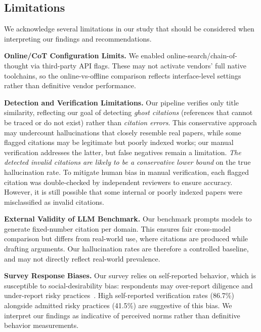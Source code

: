 \subsection{Limitations}

We acknowledge several limitations in our study that should be considered when interpreting our findings and recommendations.


\noindent
\textbf{Online/CoT Configuration Limits.}
We enabled online-search/chain-of-thought via third-party API flags. These may not activate vendors' full native toolchains, so the online-vs-offline comparison reflects interface-level settings rather than definitive vendor performance.

\noindent
\textbf{Detection and Verification Limitations.}
Our pipeline verifies only title similarity, reflecting our goal of detecting \emph{ghost citations} (references that cannot be traced or do not exist) rather than \emph{citation errors}.
This conservative approach may undercount hallucinations that closely resemble real papers, while some flagged citations may be legitimate but poorly indexed works; our manual verification addresses the latter, but false negatives remain a limitation. 
\textit{The detected invalid citations are likely to be a conservative lower bound} on the true hallucination rate.
To mitigate human bias in manual verification, each flagged citation was double-checked by independent reviewers to ensure accuracy.
However, it is still possible that some internal or poorly indexed papers were misclassified as invalid citations.

\noindent
\textbf{External Validity of LLM Benchmark.}
Our benchmark prompts models to generate fixed-number citation per domain. This ensures fair cross-model comparison but differs from real-world use, where citations are produced while drafting arguments. Our hallucination rates are therefore a controlled baseline, and may not directly reflect real-world prevalence.

\noindent
\textbf{Survey Response Biases.}
Our survey relies on self-reported behavior, which is susceptible to social-desirability bias: respondents may over-report diligence and under-report risky practices~\cite{redmiles2017survey}. High self-reported verification rates (86.7\%) alongside admitted risky practices (41.5\%) are suggestive of this bias. We interpret our findings as indicative of perceived norms rather than definitive behavior measurements.

